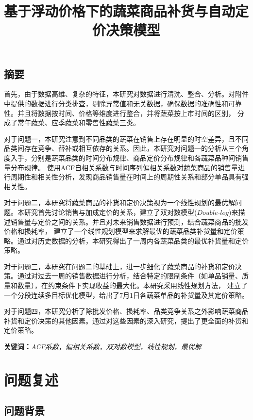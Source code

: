 \documentclass{article}
\title{\large 基于浮动价格下的蔬菜商品补货与自动定价决策模型}
\date{}
\begin{document}
\maketitle
\begin{center}
\section*{摘要}
\end{center}
\vspace{-1em}
\noindent
\indent 首先，由于数据高维、复杂的特征，本研究对数据进行清洗、整合、分析。对附件中提供的数据进行分类排查，剔除异常值和无关数据，确保数据的准确性和可靠性。并且将数据按时间、价格等维度进行整合，并将蔬菜按上市时间的区别，
分成了常年蔬菜、应季蔬菜和零售性蔬菜三类。

对于问题一，本研究注意到不同品类的蔬菜在销售上存在明显的时空差异，且不同品类间存在竞争、替补或相互依存的关系。因此，本研究对问题一的分析从三个角度入手，分别是蔬菜品类的时间分布规律、商品定价分布规律和各蔬菜品种间销售量分布规律。
使用ACF自相关系数与时间序列偏相关系数对蔬菜商品的销售量进行周期性和相关性分析，发现商品销售量在时间上的周期性关系和部分单品具有强相关性。

对于问题二，本研究将蔬菜商品的补货和定价决策视为一个线性规划的最优解问题。本研究首先讨论销售与加成定价的关系，建立了双对数模型($Double$-$log$)来描述销售量与定价之间的关系。并且对未来销售数据进行预测，结合蔬菜商品的批发价格和损耗率，
建立了一个线性规划模型来求解最优的蔬菜品类补货量和定价策略。通过对历史数据的分析，本研究得出了一周内各蔬菜品类的最优补货量和定价策略。

对于问题三，本研究在问题二的基础上，进一步细化了蔬菜商品的补货和定价决策。通过对过去一周的销售数据进行分析，结合特定的限制条件（如单品销量、质量和数量），在约束条件下实现收益的最大化。本研究采用线性规划方法，
建立了一个分段连续多目标优化模型，给出了7月1日各蔬菜单品的补货量及其定价策略。

对于问题四，本研究分析了除批发价格、损耗率、品类竞争关系之外影响蔬菜商品补货和定价决策的其他因素。通过对这些因素的深入研究，提出了更全面的补货和定价策略。

\noindent
\textbf{关键词：}\textit{ACF系数}，\textit{偏相关系数}，\textit{双对数模型}，\textit{线性规划}，\textit{最优解}

\section{问题复述}

\subsection{问题背景}
\end{document}
